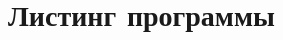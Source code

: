 \documentclass[a4paper,12pt]{article}
\begin{document}
\section{Листинг программы}



\end{document}
